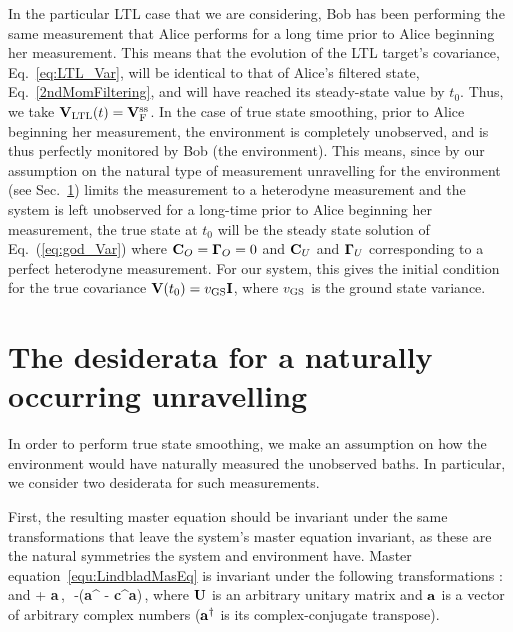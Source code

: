 \documentclass[./Main-revtex.tex]{subfiles}
\begin{document}
In the particular LTL case that we are considering, Bob has been performing the same measurement that Alice performs for a long time prior to Alice beginning her measurement. %
This means that the evolution of the LTL target's covariance, Eq.~\eqref{eq:LTL_Var}, will be identical to that of Alice's filtered state, Eq.~\eqref{2ndMomFiltering}, and will have reached its steady-state value by $t_0$. Thus, we take ${\bf V}_{\rm LTL}(t) = {\bf V}_{\text F}^{\rm ss}$. In the case of true state smoothing, prior to Alice beginning her measurement, the environment is completely unobserved, and is thus perfectly monitored by Bob (the environment).
This means, since by our assumption on the natural type of measurement unravelling for the environment (see Sec.~\ref{sec:methods_Nat_Unrav}) limits the measurement to a heterodyne measurement and the system is left unobserved for a long-time prior to Alice beginning her measurement, the true state at $t_0$ will be the steady state solution of Eq.~(\ref{eq:god_Var}) where ${\bf C}_{O} = {\bf \Gamma}_{O} = 0$ and ${\bf C}_{U}$ and ${\bf \Gamma}_U$ corresponding to a perfect heterodyne measurement. For our system, this gives the initial condition for the true covariance ${\bf V}(t_0) = v_{\rm GS}{\bf I}$, where $v_{\rm GS}$ is the ground state variance.

\section{The desiderata for a naturally occurring unravelling}\label{sec:methods_Nat_Unrav}

In order to perform true state smoothing, we make an assumption on how the environment would have naturally measured
the unobserved baths. In particular, we consider two desiderata for such measurements.

First, the resulting master equation should be invariant under the same transformations that leave the system's master equation invariant, as these are the natural symmetries the system and environment have. Master equation~\eqref{equ:LindbladMasEq} is invariant under the following transformations \cite{wiseman2009quantum}:
\beq
{} 
\label{sohet}
\eeq
and 
\beq
{} \to {} + {\bf a}\,,\quad\,\,  \to {} -({\bf a}^{\dagger} - {\bf c}^{\dagger}{\bf a})\,, \label{sodyne}
\eeq
where ${\bf U}$ is an arbitrary unitary matrix and ${\bf a}$ is a vector of arbitrary complex numbers (${\bf a}^{\dagger}$ is its complex-conjugate transpose).
\end{document}
